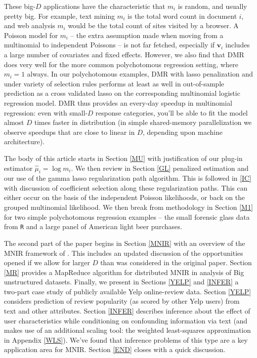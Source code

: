 \documentclass[12pt]{article}
\newcommand{\bm}[1]{\mathbf{#1}}
\newcommand{\cd}[1]{{\tt#1}}
\begin{document}
These big-$D$ applications have the characteristic that $m_i$ is
random, and usually pretty big.  For example, text mining $m_i$ is the total
word count in document $i$, and web analysis $m_i$ would be the total count of
sites visited by a browser.  A Poisson model for $m_i$ -- the extra assumption
made when moving from a multinomial to independent Poissons -- is not far
fetched, especially if $\bm{v}_i$ includes a large number of covariates and
fixed effects.  However, we also find that DMR does very well for the more
common polychotomous regression setting, where $m_i=1$ always.   In our
polychotomous examples, DMR with lasso penalization and under variety of
selection rules performs at least as well in out-of-sample prediction as a
cross validated lasso on the corresponding multinomial logistic regression
model.  DMR thus provides an every-day speedup in
multinomial regression: even with small-$D$ response
categories, you'll be able to fit the model almost $D$ times faster in
distribution (in simple shared-memory parallelization we observe speedups that
are close to linear in $D$, depending upon machine architecture).

The body of this article starts in Section \ref{MU} with justification of our
plug-in estimator $\hat \mu_i = \log m_i$.  We then review in Section \ref{GL}
penalized estimation and our use of the gamma lasso regularization path
algorithm.  This is followed in \ref{IC} with discussion of coefficient
selection along these regularization paths.  This can either occur on the
basis of the independent Poisson likelihoods, or back on the grouped
multinomial likelihood.  We then break from methodology in Section \ref{M1}
for two simple polychotomous regression examples -- the small forensic glass
data from \cd{R} and a large panel of American light beer purchases.

The second part of the paper begins in Section \ref{MNIR} with an overview of
the MNIR framework of \cite{taddy_multinomial_2013}.  This includes an updated
discussion of the opportunities opened if we allow for larger $D$ than was
considered in the original paper.  Section \ref{MR} provides a MapReduce
algorithm for distributed MNIR in analysis of Big unstructured
datasets.   Finally, we present in Sections \ref{YELP} and \ref{INFER} 
a two-part case study of publicly available Yelp online-review data.   Section
\ref{YELP} considers prediction of review popularity (as scored by other Yelp
users) from text and other attributes.  Section \ref{INFER} describes
inference about the effect of user characteristics while conditioning on
confounding information via text (and makes use of an additional scaling tool:
the weighted least-squares approximation in Appendix \ref{WLS}). We've found
that inference problems of this type are a key application area for MNIR.
Section \ref{END} closes with a quick discussion.
\end{document}
